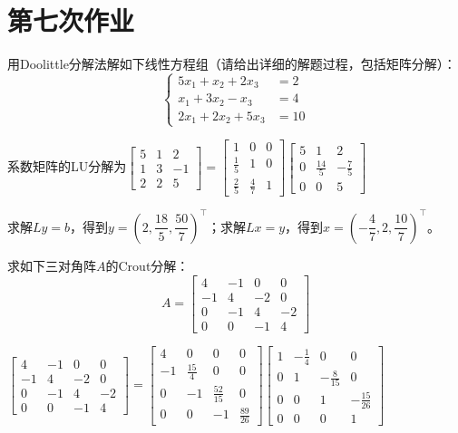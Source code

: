 \chapter{第七次作业}

    \begin{homework}[10pts]
        用Doolittle分解法解如下线性方程组（请给出详细的解题过程，包括矩阵分解）：
            \[\begin{cases}5x_1+x_2+2x_3&=2\\x_1+3x_2-x_3&=4\\2x_1+2x_2+5x_3&=10\end{cases}\]
    \end{homework}

    \begin{solution}
        系数矩阵的LU分解为$\begin{bmatrix}5&1&2\\1&3&-1\\2&2&5\end{bmatrix}=\begin{bmatrix}1&0&0\\\frac15&1&0\\\frac25&\frac47&1\end{bmatrix}\begin{bmatrix}5&1&2\\0&\frac{14}5&-\frac75\\0&0&5\end{bmatrix}$

        求解$Ly=b$，得到$y=\left(2,\dfrac{18}5,\dfrac{50}7\right)^{\top}$；求解$Lx=y$，得到$x=\left(-\dfrac47,2,\dfrac{10}7\right)^{\top}$。
    \end{solution}

    \begin{homework}[10pts]
        求如下三对角阵$A$的Crout分解：
            \[A=\begin{bmatrix}4&-1&0&0\\-1&4&-2&0\\0&-1&4&-2\\0&0&-1&4\end{bmatrix}\]
    \end{homework}

    \begin{solution}
        $\begin{bmatrix}4&-1&0&0\\-1&4&-2&0\\0&-1&4&-2\\0&0&-1&4\end{bmatrix}=\begin{bmatrix}4&0&0&0\\-1&\frac{15}4&0&0\\0&-1&\frac{52}{15}&0\\0&0&-1&\frac{89}{26}\end{bmatrix}\begin{bmatrix}1&-\frac14&0&0\\0&1&-\frac8{15}&0\\0&0&1&-\frac{15}{26}\\0&0&0&1\end{bmatrix}$
    \end{solution}

